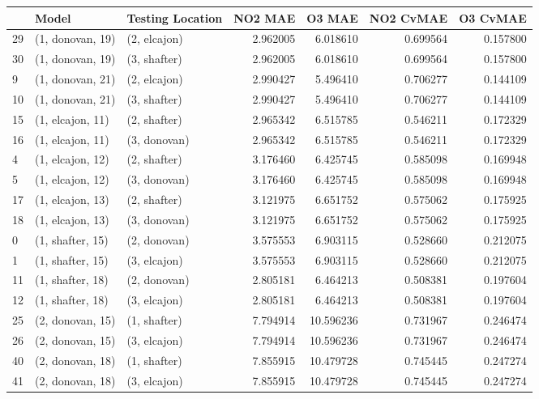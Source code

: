 \begin{tabular}{lllrrrr}
\toprule
{} &             Model & Testing Location &   NO2 MAE &     O3 MAE &  NO2 CvMAE &  O3 CvMAE \\
\midrule
29 &  (1, donovan, 19) &     (2, elcajon) &  2.962005 &   6.018610 &   0.699564 &  0.157800 \\
30 &  (1, donovan, 19) &     (3, shafter) &  2.962005 &   6.018610 &   0.699564 &  0.157800 \\
9  &  (1, donovan, 21) &     (2, elcajon) &  2.990427 &   5.496410 &   0.706277 &  0.144109 \\
10 &  (1, donovan, 21) &     (3, shafter) &  2.990427 &   5.496410 &   0.706277 &  0.144109 \\
15 &  (1, elcajon, 11) &     (2, shafter) &  2.965342 &   6.515785 &   0.546211 &  0.172329 \\
16 &  (1, elcajon, 11) &     (3, donovan) &  2.965342 &   6.515785 &   0.546211 &  0.172329 \\
4  &  (1, elcajon, 12) &     (2, shafter) &  3.176460 &   6.425745 &   0.585098 &  0.169948 \\
5  &  (1, elcajon, 12) &     (3, donovan) &  3.176460 &   6.425745 &   0.585098 &  0.169948 \\
17 &  (1, elcajon, 13) &     (2, shafter) &  3.121975 &   6.651752 &   0.575062 &  0.175925 \\
18 &  (1, elcajon, 13) &     (3, donovan) &  3.121975 &   6.651752 &   0.575062 &  0.175925 \\
0  &  (1, shafter, 15) &     (2, donovan) &  3.575553 &   6.903115 &   0.528660 &  0.212075 \\
1  &  (1, shafter, 15) &     (3, elcajon) &  3.575553 &   6.903115 &   0.528660 &  0.212075 \\
11 &  (1, shafter, 18) &     (2, donovan) &  2.805181 &   6.464213 &   0.508381 &  0.197604 \\
12 &  (1, shafter, 18) &     (3, elcajon) &  2.805181 &   6.464213 &   0.508381 &  0.197604 \\
25 &  (2, donovan, 15) &     (1, shafter) &  7.794914 &  10.596236 &   0.731967 &  0.246474 \\
26 &  (2, donovan, 15) &     (3, elcajon) &  7.794914 &  10.596236 &   0.731967 &  0.246474 \\
40 &  (2, donovan, 18) &     (1, shafter) &  7.855915 &  10.479728 &   0.745445 &  0.247274 \\
41 &  (2, donovan, 18) &     (3, elcajon) &  7.855915 &  10.479728 &   0.745445 &  0.247274 \\

\end{tabular}
